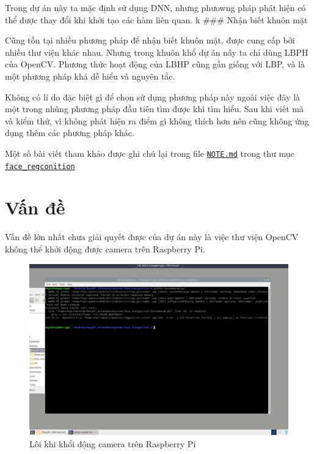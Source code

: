 Trong dự án này ta mặc định sử dụng DNN, nhưng phưowng pháp phát hiện có
thể được thay đổi khi khởi tạo các hàm liên quan. k \#\#\# Nhận biết
khuôn mặt

Cũng tồn tại nhiều phương pháp để nhận biết khuôn mặt, được cung cấp bởi
nhiều thư viện khác nhau. Nhưng trong khuôn khổ dự án nầy ta chỉ dùng
LBPH của OpenCV. Phương thức hoạt động của LBHP cũng gần giống với LBP,
và là một phương pháp khá dễ hiểu và nguyên tắc.

Không có lí do đặc biệt gì để chọn sử dụng phương pháp này ngoài việc
đây là một trong nhũng phương pháp đầu tiên tìm được khi tìm hiểu. Sau
khi viết mã và kiểm thử, vì không phát hiện ra điểm gì không thích hơn
nên cũng không ứng dụng thêm các phương pháp khác.

Một số bài viết tham khảo được ghi chú lại trong file
\href{https://github.com/ntpt7921/RaspPi_AttendanceSystem/blob/main/face_recognition/NOTE.md}{\texttt{NOTE.md}}
trong thư mục
\href{https://github.com/ntpt7921/RaspPi_AttendanceSystem/tree/main/face_recognition}{\texttt{face\_regconition}}

\hypertarget{vux1ea5n-ux111ux1ec1}{%
\section{Vấn đề}\label{vux1ea5n-ux111ux1ec1}}

Vấn đề lớn nhất chưa giải quyết được của dự án này là việc thư viện
OpenCV không thể khởi động được camera trên Raspberry Pi.

\begin{figure}
\centering
\includegraphics{raspi_camera_error.png}
\caption{Lôi khi khổi động camera trên Raspberry Pi}
\end{figure}

